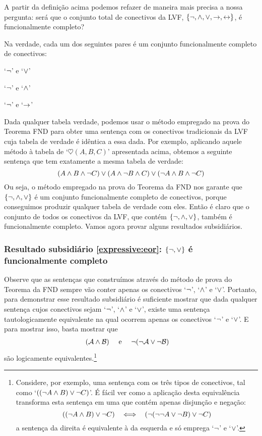 A partir da definição acima podemos refazer de maneira mais precisa a nossa pergunta: será que o conjunto total de conectivos da LVF, $\{\neg, \wedge, \vee, \rightarrow, \leftrightarrow\}$, é funcionalmente completo?

Na verdade, cada um dos seguintes pares é um conjunto funcionalmente completo de conectivos:
\begin{earg}
\item\label{expressive:eor} `$\neg$' e `$\vee$'
\item\label{expressive:eand} `$\neg$' e `$\wedge$'
\item\label{expressive:eif} `$\neg$' e `$\rightarrow$'
\end{earg}

Dada qualquer tabela verdade, podemos usar o método empregado na prova do Teorema FND para obter uma sentença com os conectivos tradicionais da LVF cuja tabela de verdade é idêntica a essa dada. Por exemplo, aplicando aquele método à tabela de `$\heartsuit(A, B, C)$' apresentada acima, obtemos a seguinte sentença que tem exatamente a mesma tabela de verdade:
		$$(A \wedge B \wedge \neg C) \vee (A \wedge \neg B \wedge C) \vee (\neg A \wedge B \wedge \neg C)$$			
Ou seja, o método empregado na prova do Teorema da FND nos garante que $\{\neg, \wedge, \vee \}$ é um conjunto funcionalmente completo de conectivos, porque conseguimos produzir qualquer tabela de verdade com eles.
Então é claro que o conjunto de todos os conectivos da LVF, que contém $\{\neg, \wedge, \vee \}$, também é funcionalmente completo.
Vamos agora provar alguns resultados subsidiários.

\subsubsection{Resultado subsidiário \ref{expressive:eor}: $\{\neg, \vee \}$ é funcionalmente completo}	
Observe que as sentenças que construímos através do método de prova do Teorema da FND sempre vão conter apenas os conectivos `$\neg$', `$\wedge$' e `$\vee$'.
Portanto, para demonstrar esse resultado subsidiário é suficiente mostrar que dada qualquer sentença cujos conectivos sejam `$\neg$', `$\wedge$' e `$\vee$', existe uma sentença tautologicamente equivalente na qual ocorrem apenas os conectivos `$\neg$' e `$\vee$'.
E para mostrar isso, basta mostrar que
		\begin{align*}
		(\mathcal{A} \wedge \mathcal{B}) & \text{\quad \ e \quad} \neg(\neg \mathcal{A} \vee\neg \mathcal{B})
		\end{align*}
		são logicamente equivalentes.\footnote{
			Considere, por exemplo, uma sentença com os três tipos de conectivos, tal como `$((\neg A \wedge B) \vee \neg C)$'.
			É fácil ver como a aplicação desta equivalência transforma esta sentença em uma que contém apenas disjunção e negação:
			$$((\enot A \eand B) \eor \enot C) \ \ \iff \ \ (\enot(\enot\enot A \eor\enot B) \eor \enot C)$$
			a sentença da direita é equivalente à da esquerda e só emprega `$\neg$' e `$\vee$'.}

